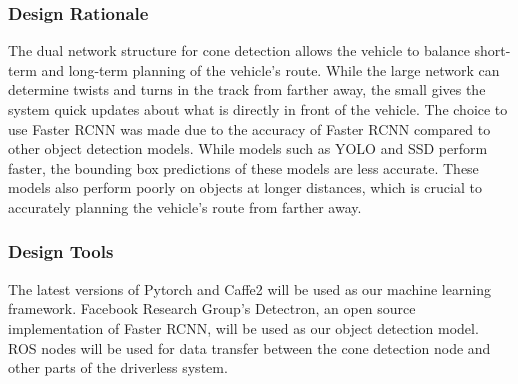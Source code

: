 \documentclass[10pt, onecolumn, draftclsnofoot, letterpaper,compsoc]{IEEEtran}
\begin{document}


\subsubsection{Design Rationale} %
The dual network structure for cone detection allows the vehicle to balance short-term and long-term planning of the vehicle's route. While the large network can determine twists and turns in the track from farther away, the small gives the system quick updates about what is directly in front of the vehicle. The choice to use Faster RCNN was made due to the accuracy of Faster RCNN compared to other object detection models. While models such as YOLO and SSD perform faster, the bounding box predictions of these models are less accurate. These models also perform poorly on objects at longer distances, which is crucial to accurately planning the vehicle's route from farther away.

\subsubsection{Design Tools} %
The latest versions of Pytorch and Caffe2 will be used as our machine learning framework. Facebook Research Group's Detectron, an open source implementation of Faster RCNN, will be used as our object detection model. ROS nodes will be used for data transfer between the cone detection node and other parts of the driverless system. 
\end{document}
